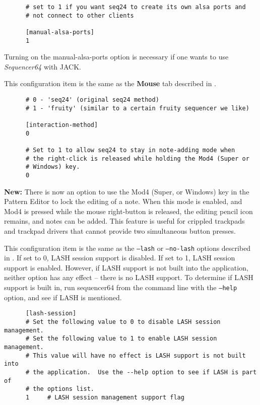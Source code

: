    \begin{verbatim}
      # set to 1 if you want seq24 to create its own alsa ports and
      # not connect to other clients

      [manual-alsa-ports]
      1
   \end{verbatim}

   Turning on the manual-alsa-ports option is necessary if one
   wants to use \textsl{Sequencer64} with JACK.

   This configuration item is the same as the 
   \textbf{Mouse} tab described in
   .

   \begin{verbatim}
      # 0 - 'seq24' (original seq24 method)
      # 1 - 'fruity' (similar to a certain fruity sequencer we like)

      [interaction-method]
      0

      # Set to 1 to allow seq24 to stay in note-adding mode when
      # the right-click is released while holding the Mod4 (Super or
      # Windows) key.
      0
   \end{verbatim}

   \textbf{New:}
   There is now an option to use the Mod4 (Super, or Windows) key in the
   Pattern Editor to lock the editing of a note.  When this mode is enabled,
   and Mod4 is pressed while the mouse right-button is released, the
   editing pencil icon remains, and notes can be added.  This feature is
   useful for crippled trackpads and trackpad drivers that cannot provide
   two simultaneous button presses.

   This configuration item is the same as the
   \texttt{--lash} or \texttt{--no-lash} options described in
   .
   If set to 0, LASH session support is disabled.
   If set to 1, LASH session support is enabled.
   However, if LASH support is not built into the application, neither option
   has any effect -- there is no LASH support.  
   To determine if LASH support is built in, run sequencer64 from the command
   line with the \texttt{--help} option, and see if LASH is mentioned.

   \begin{verbatim}
      [lash-session]
      # Set the following value to 0 to disable LASH session management.
      # Set the following value to 1 to enable LASH session management.
      # This value will have no effect is LASH support is not built into
      # the application.  Use the --help option to see if LASH is part of
      # the options list.
      1     # LASH session management support flag
   \end{verbatim}

